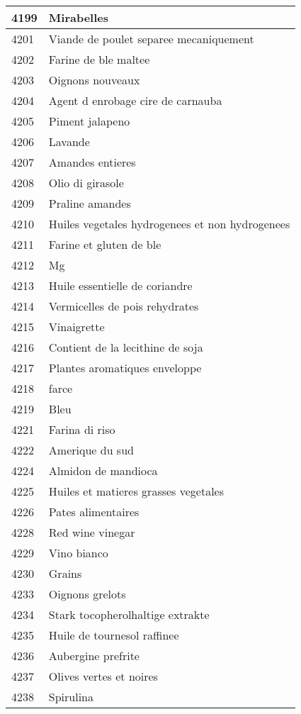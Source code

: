 \begin{longtable}{|l|l|}
4199 & Mirabelles \\ \hline 
4201 & Viande de poulet separee mecaniquement \\ \hline 
4202 & Farine de ble maltee \\ \hline 
4203 & Oignons nouveaux \\ \hline 
4204 & Agent d enrobage cire de carnauba \\ \hline 
4205 & Piment jalapeno \\ \hline 
4206 & Lavande \\ \hline 
4207 & Amandes entieres \\ \hline 
4208 & Olio di girasole \\ \hline 
4209 & Praline amandes \\ \hline 
4210 & Huiles vegetales hydrogenees et non hydrogenees \\ \hline 
4211 & Farine et gluten de ble \\ \hline 
4212 & Mg \\ \hline 
4213 & Huile essentielle de coriandre \\ \hline 
4214 & Vermicelles de pois rehydrates \\ \hline 
4215 & Vinaigrette \\ \hline 
4216 & Contient de la lecithine de soja \\ \hline 
4217 & Plantes aromatiques enveloppe \\ \hline 
4218 & farce \\ \hline 
4219 & Bleu \\ \hline 
4221 & Farina di riso \\ \hline 
4222 & Amerique du sud \\ \hline 
4224 & Almidon de mandioca \\ \hline 
4225 & Huiles et matieres grasses vegetales \\ \hline 
4226 & Pates alimentaires \\ \hline 
4228 & Red wine vinegar \\ \hline 
4229 & Vino bianco \\ \hline 
4230 & Grains \\ \hline 
4233 & Oignons grelots \\ \hline 
4234 & Stark tocopherolhaltige extrakte \\ \hline 
4235 & Huile de tournesol raffinee \\ \hline 
4236 & Aubergine prefrite \\ \hline 
4237 & Olives vertes et noires \\ \hline 
4238 & Spirulina \\ \hline 

\end{longtable}
